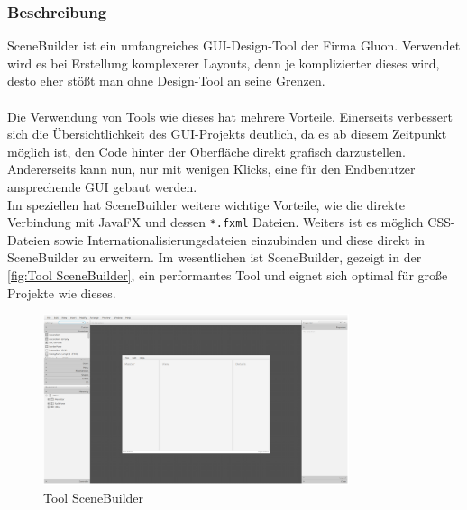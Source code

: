 \subsubsection{Beschreibung}
SceneBuilder ist ein umfangreiches GUI-Design-Tool der Firma Gluon.
Verwendet wird es bei Erstellung komplexerer Layouts, denn je komplizierter dieses wird, desto eher stößt man ohne Design-Tool an seine Grenzen.\\\\
Die Verwendung von Tools wie dieses hat mehrere Vorteile.
Einerseits verbessert sich die Übersichtlichkeit des GUI-Projekts deutlich, da es ab diesem Zeitpunkt möglich ist, den Code hinter der Oberfläche direkt grafisch darzustellen.
Andererseits kann nun, nur mit wenigen Klicks, eine für den Endbenutzer ansprechende GUI gebaut werden.\\
Im speziellen hat SceneBuilder weitere wichtige Vorteile, wie die direkte Verbindung mit JavaFX und dessen \lstinline{*.fxml} Dateien.
Weiters ist es möglich CSS-Dateien sowie Internationalisierungsdateien einzubinden und diese direkt in SceneBuilder zu erweitern.
Im wesentlichen ist SceneBuilder, gezeigt in der \autoref{fig:Tool SceneBuilder}, ein performantes Tool und eignet sich optimal für große Projekte wie dieses.
\begin{figure}[H]
    \centering
    \includegraphics[width=0.8\textwidth]{fig/ainf/SceneBuilder.png}
    \caption{Tool SceneBuilder}
    \label{fig:Tool SceneBuilder}
\end{figure}
